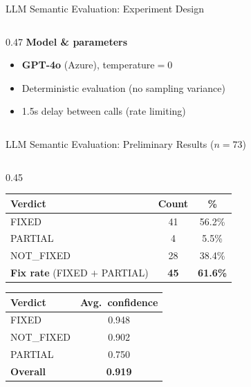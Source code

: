 \documentclass[aspectratio=169,10pt]{beamer}
\begin{document}
\begin{frame}{LLM Semantic Evaluation: Experiment Design}
\begin{columns}[T]
\begin{column}{0.47\textwidth}
  \vspace{0.5em}
  \textbf{Model \& parameters}
  {\scriptsize
  \begin{itemize}\setlength{\itemsep}{2pt}
    \item \textbf{GPT-4o} (Azure), temperature$=$0
    \item Deterministic evaluation (no sampling variance)
    \item 1.5s delay between calls (rate limiting)
  \end{itemize}}

\end{column}
\end{columns}
\end{frame}


\begin{frame}{LLM Semantic Evaluation: Preliminary Results ($n{=}73$)}

  \begin{columns}[T]
  \begin{column}{0.45\textwidth}

  \centering
  \vspace{0.5em}
  {\small
  \renewcommand{\arraystretch}{1.35}
  \setlength{\tabcolsep}{5pt}
  \begin{tabular}{l c c}
    \toprule
    \textbf{Verdict} & \textbf{Count} & \textbf{\%} \\
    \midrule
    \rowcolor{hit!12}
    FIXED       & 41 & 56.2\% \\
    \rowcolor{warn!12}
    PARTIAL     &  4 &  5.5\% \\
    \rowcolor{miss!12}
    NOT\_FIXED  & 28 & 38.4\% \\
    \midrule
    \rowcolor{c1!8}
    \textbf{Fix rate} (FIXED $+$ PARTIAL) & \textbf{45} & \textbf{61.6\%} \\
    \bottomrule
  \end{tabular}}

  \vspace{0.8em}
  {\scriptsize
  \renewcommand{\arraystretch}{1.25}
  \begin{tabular}{l c}
    \toprule
    \textbf{Verdict} & \textbf{Avg.\ confidence} \\
    \midrule
    FIXED       & 0.948 \\
    NOT\_FIXED  & 0.902 \\
    PARTIAL     & 0.750 \\
    \midrule
    \textbf{Overall} & \textbf{0.919} \\
    \bottomrule
  \end{tabular}}


\end{column}
\end{columns}
\end{frame}
\end{document}
